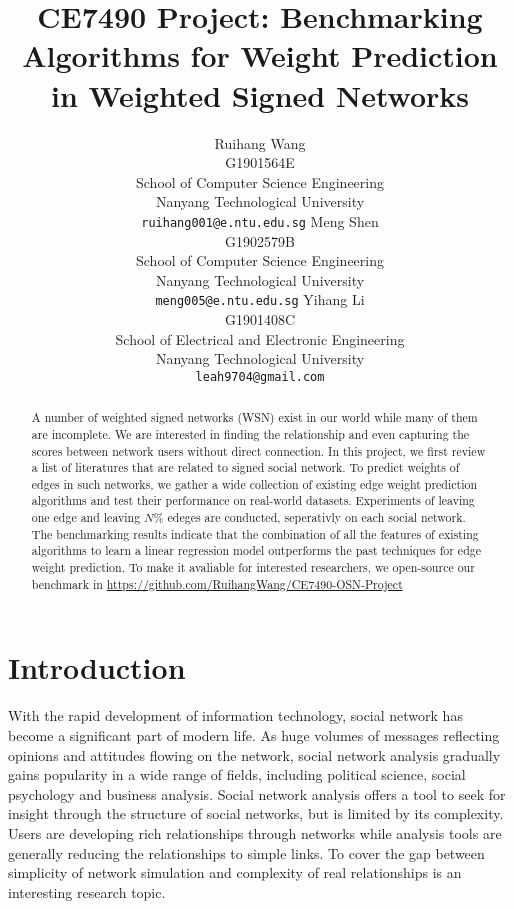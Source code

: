 \documentclass{article}
\title{CE7490 Project: Benchmarking Algorithms for Weight Prediction in Weighted Signed Networks}
\author{
  Ruihang Wang\\
  G1901564E\\
  School of Computer Science Engineering\\
  Nanyang Technological University\\
  \texttt{ruihang001@e.ntu.edu.sg} 
  \And
  Meng Shen\\
  G1902579B\\
  School of Computer Science Engineering\\
  Nanyang Technological University\\
  \texttt{meng005@e.ntu.edu.sg}
  \And
  Yihang Li\\
  G1901408C\\
  School of Electrical and Electronic Engineering\\
  Nanyang Technological University\\
  \texttt{leah9704@gmail.com}
}
\begin{document}
\maketitle

\begin{abstract}
  A number of weighted signed networks (WSN) exist in our world while 
  many of them are incomplete. We are interested in finding the relationship
  and even capturing the scores between network users without direct connection.
  In this project, we first review a list of literatures that are
  related to signed social network. To predict weights of edges in 
  such networks, we gather a wide collection of existing edge weight
  prediction algorithms and test their performance on real-world datasets.
  Experiments of leaving one edge and leaving $N\%$ edeges are conducted,
  seperativly on each social network. The benchmarking results indicate
  that the combination of all the features of existing algorithms to learn
  a linear regression model outperforms the past techniques for edge weight
  prediction. To make it avaliable for interested researchers, we open-source our benchmark in 
  \url{https://github.com/RuihangWang/CE7490-OSN-Project}
\end{abstract}

\section{Introduction}

With the rapid development of information technology, social 
network has become a significant part of modern life. As 
huge volumes of messages reflecting opinions and attitudes 
flowing on the network, social network analysis gradually gains 
popularity in a wide range of fields, including political 
science, social psychology and business analysis. Social 
network analysis offers a tool to seek for insight through 
the structure of social networks, but is limited by its 
complexity. Users are developing rich relationships through 
networks while analysis tools are generally reducing the 
relationships to simple links. To cover the gap between 
simplicity of network simulation and complexity of real 
relationships is an interesting research topic. 
\end{document}
